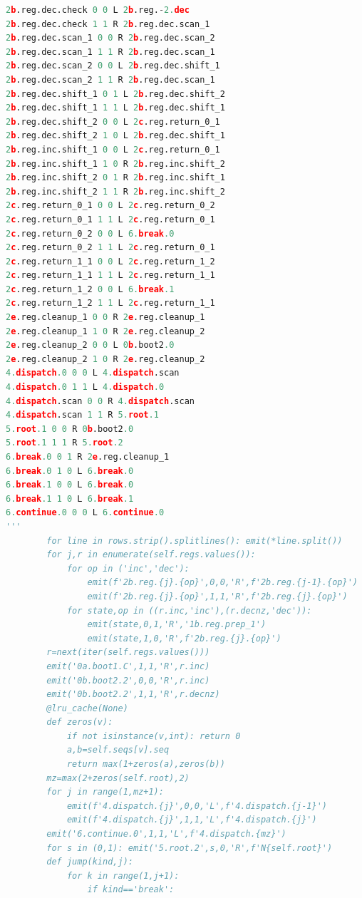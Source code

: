 \documentclass[10pt]{article}
\theoremstyle{definition}
\begin{document}
\begin{lstlisting}[language=Python,basicstyle=\ttfamily\tiny,breaklines=true,columns=fullflexible,keepspaces=true]
2b.reg.dec.check 0 0 L 2b.reg.-2.dec
2b.reg.dec.check 1 1 R 2b.reg.dec.scan_1
2b.reg.dec.scan_1 0 0 R 2b.reg.dec.scan_2
2b.reg.dec.scan_1 1 1 R 2b.reg.dec.scan_1
2b.reg.dec.scan_2 0 0 L 2b.reg.dec.shift_1
2b.reg.dec.scan_2 1 1 R 2b.reg.dec.scan_1
2b.reg.dec.shift_1 0 1 L 2b.reg.dec.shift_2
2b.reg.dec.shift_1 1 1 L 2b.reg.dec.shift_1
2b.reg.dec.shift_2 0 0 L 2c.reg.return_0_1
2b.reg.dec.shift_2 1 0 L 2b.reg.dec.shift_1
2b.reg.inc.shift_1 0 0 L 2c.reg.return_0_1
2b.reg.inc.shift_1 1 0 R 2b.reg.inc.shift_2
2b.reg.inc.shift_2 0 1 R 2b.reg.inc.shift_1
2b.reg.inc.shift_2 1 1 R 2b.reg.inc.shift_2
2c.reg.return_0_1 0 0 L 2c.reg.return_0_2
2c.reg.return_0_1 1 1 L 2c.reg.return_0_1
2c.reg.return_0_2 0 0 L 6.break.0
2c.reg.return_0_2 1 1 L 2c.reg.return_0_1
2c.reg.return_1_1 0 0 L 2c.reg.return_1_2
2c.reg.return_1_1 1 1 L 2c.reg.return_1_1
2c.reg.return_1_2 0 0 L 6.break.1
2c.reg.return_1_2 1 1 L 2c.reg.return_1_1
2e.reg.cleanup_1 0 0 R 2e.reg.cleanup_1
2e.reg.cleanup_1 1 0 R 2e.reg.cleanup_2
2e.reg.cleanup_2 0 0 L 0b.boot2.0
2e.reg.cleanup_2 1 0 R 2e.reg.cleanup_2
4.dispatch.0 0 0 L 4.dispatch.scan
4.dispatch.0 1 1 L 4.dispatch.0
4.dispatch.scan 0 0 R 4.dispatch.scan
4.dispatch.scan 1 1 R 5.root.1
5.root.1 0 0 R 0b.boot2.0
5.root.1 1 1 R 5.root.2
6.break.0 0 1 R 2e.reg.cleanup_1
6.break.0 1 0 L 6.break.0
6.break.1 0 0 L 6.break.0
6.break.1 1 0 L 6.break.1
6.continue.0 0 0 L 6.continue.0
'''
        for line in rows.strip().splitlines(): emit(*line.split())
        for j,r in enumerate(self.regs.values()):
            for op in ('inc','dec'):
                emit(f'2b.reg.{j}.{op}',0,0,'R',f'2b.reg.{j-1}.{op}')
                emit(f'2b.reg.{j}.{op}',1,1,'R',f'2b.reg.{j}.{op}')
            for state,op in ((r.inc,'inc'),(r.decnz,'dec')):
                emit(state,0,1,'R','1b.reg.prep_1')
                emit(state,1,0,'R',f'2b.reg.{j}.{op}')
        r=next(iter(self.regs.values()))
        emit('0a.boot1.C',1,1,'R',r.inc)
        emit('0b.boot2.2',0,0,'R',r.inc)
        emit('0b.boot2.2',1,1,'R',r.decnz)
        @lru_cache(None)
        def zeros(v):
            if not isinstance(v,int): return 0
            a,b=self.seqs[v].seq
            return max(1+zeros(a),zeros(b))
        mz=max(2+zeros(self.root),2)
        for j in range(1,mz+1):
            emit(f'4.dispatch.{j}',0,0,'L',f'4.dispatch.{j-1}')
            emit(f'4.dispatch.{j}',1,1,'L',f'4.dispatch.{j}')
        emit('6.continue.0',1,1,'L',f'4.dispatch.{mz}')
        for s in (0,1): emit('5.root.2',s,0,'R',f'N{self.root}')
        def jump(kind,j):
            for k in range(1,j+1):
                if kind=='break':

\end{lstlisting}
\end{document}
